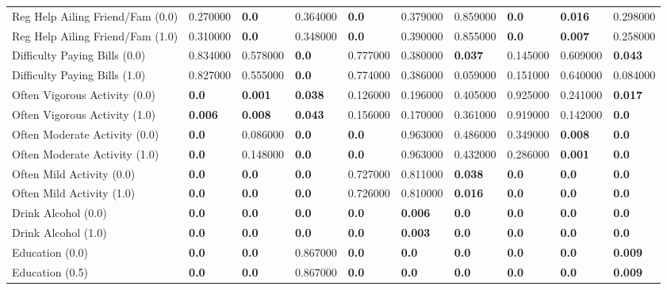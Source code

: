 \begin{tabular}{llllllllll}
Reg Help Ailing Friend/Fam (0.0) & 0.270000 & \textbf{0.0} & 0.364000 & \textbf{0.0} & 0.379000 & 0.859000 & \textbf{0.0} & \textbf{0.016} & 0.298000 \\
Reg Help Ailing Friend/Fam (1.0) & 0.310000 & \textbf{0.0} & 0.348000 & \textbf{0.0} & 0.390000 & 0.855000 & \textbf{0.0} & \textbf{0.007} & 0.258000 \\
Difficulty Paying Bills (0.0) & 0.834000 & 0.578000 & \textbf{0.0} & 0.777000 & 0.380000 & \textbf{0.037} & 0.145000 & 0.609000 & \textbf{0.043} \\
Difficulty Paying Bills (1.0) & 0.827000 & 0.555000 & \textbf{0.0} & 0.774000 & 0.386000 & 0.059000 & 0.151000 & 0.640000 & 0.084000 \\
Often Vigorous Activity (0.0) & \textbf{0.0} & \textbf{0.001} & \textbf{0.038} & 0.126000 & 0.196000 & 0.405000 & 0.925000 & 0.241000 & \textbf{0.017} \\
Often Vigorous Activity (1.0) & \textbf{0.006} & \textbf{0.008} & \textbf{0.043} & 0.156000 & 0.170000 & 0.361000 & 0.919000 & 0.142000 & \textbf{0.0} \\
Often Moderate Activity (0.0) & \textbf{0.0} & 0.086000 & \textbf{0.0} & \textbf{0.0} & 0.963000 & 0.486000 & 0.349000 & \textbf{0.008} & \textbf{0.0} \\
Often Moderate Activity (1.0) & \textbf{0.0} & 0.148000 & \textbf{0.0} & \textbf{0.0} & 0.963000 & 0.432000 & 0.286000 & \textbf{0.001} & \textbf{0.0} \\
Often Mild Activity (0.0) & \textbf{0.0} & \textbf{0.0} & \textbf{0.0} & 0.727000 & 0.811000 & \textbf{0.038} & \textbf{0.0} & \textbf{0.0} & \textbf{0.0} \\
Often Mild Activity (1.0) & \textbf{0.0} & \textbf{0.0} & \textbf{0.0} & 0.726000 & 0.810000 & \textbf{0.016} & \textbf{0.0} & \textbf{0.0} & \textbf{0.0} \\
Drink Alcohol (0.0) & \textbf{0.0} & \textbf{0.0} & \textbf{0.0} & \textbf{0.0} & \textbf{0.006} & \textbf{0.0} & \textbf{0.0} & \textbf{0.0} & \textbf{0.0} \\
Drink Alcohol (1.0) & \textbf{0.0} & \textbf{0.0} & \textbf{0.0} & \textbf{0.0} & \textbf{0.003} & \textbf{0.0} & \textbf{0.0} & \textbf{0.0} & \textbf{0.0} \\
Education (0.0) & \textbf{0.0} & \textbf{0.0} & 0.867000 & \textbf{0.0} & \textbf{0.0} & \textbf{0.0} & \textbf{0.0} & \textbf{0.0} & \textbf{0.009} \\
Education (0.5) & \textbf{0.0} & \textbf{0.0} & 0.867000 & \textbf{0.0} & \textbf{0.0} & \textbf{0.0} & \textbf{0.0} & \textbf{0.0} & \textbf{0.009} \\

\end{tabular}
